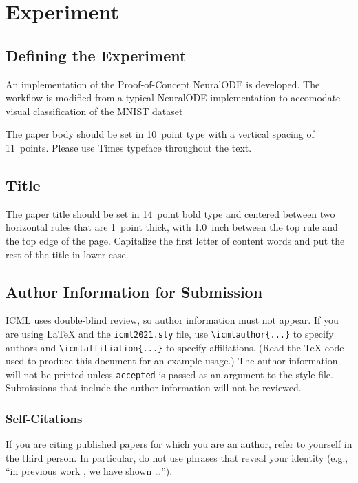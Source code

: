 \documentclass{article}
\begin{document}
\section{Experiment}

\subsection{Defining the Experiment}

An implementation of the Proof-of-Concept NeuralODE is developed. The workflow is modified from a
typical NeuralODE implementation to accomodate visual classification of the MNIST dataset

The paper body should be set in 10~point type with a vertical spacing
of 11~points. Please use Times typeface throughout the text.

\subsection{Title}

The paper title should be set in 14~point bold type and centered
between two horizontal rules that are 1~point thick, with 1.0~inch
between the top rule and the top edge of the page. Capitalize the
first letter of content words and put the rest of the title in lower
case.

\subsection{Author Information for Submission}
\label{author info}

ICML uses double-blind review, so author information must not appear. If
you are using \LaTeX\/ and the \texttt{icml2021.sty} file, use
\verb+\icmlauthor{...}+ to specify authors and \verb+\icmlaffiliation{...}+ to specify affiliations. (Read the TeX code used to produce this document for an example usage.) The author information
will not be printed unless \texttt{accepted} is passed as an argument to the
style file.
Submissions that include the author information will not
be reviewed.

\subsubsection{Self-Citations}

If you are citing published papers for which you are an author, refer
to yourself in the third person. In particular, do not use phrases
that reveal your identity (e.g., ``in previous work \cite{langley00}, we
have shown \ldots'').
\end{document}
